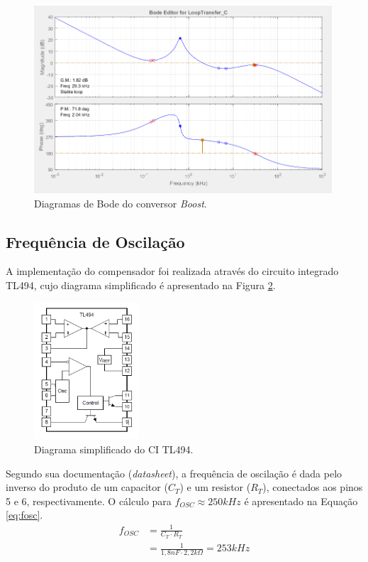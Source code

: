 \documentclass[a4paper]{article}
\begin{document}
{\begin{figure}[H]
	\centering
	\includegraphics[width=0.99\textwidth]{CompensadorBode.png}
	\caption{Diagramas de Bode do conversor \emph{Boost}.}
	\label{fig:bode-controle}
\end{figure}

\subsection{Frequência de Oscilação}

A implementação do compensador foi realizada através do circuito integrado TL494, cujo diagrama simplificado é apresentado na Figura \ref{fig:tl494}.

\begin{figure}[H]
	\centering
	\includegraphics[width=0.35\textwidth]{diag-simp.PNG}
	\caption{Diagrama simplificado do CI TL494.}
	\label{fig:tl494}
\end{figure}

Segundo sua documentação (\emph{datasheet}), a frequência de oscilação é dada pelo inverso do produto de um capacitor ($C_T$) e um resistor ($R_T$), conectados aos pinos 5 e 6, respectivamente. O cálculo para $f_{OSC} \approx 250kHz$ é apresentado na Equação \ref{eq:fosc}.
\begin{equation}
\label{eq:fosc}
\begin{split}
f_{OSC} & = \frac{1}{C_T \cdot R_T} \\
& = \frac{1}{1,8nF \cdot 2,2k\Omega} = 253kHz
\end{split}
\end{equation}

}
\end{document}
